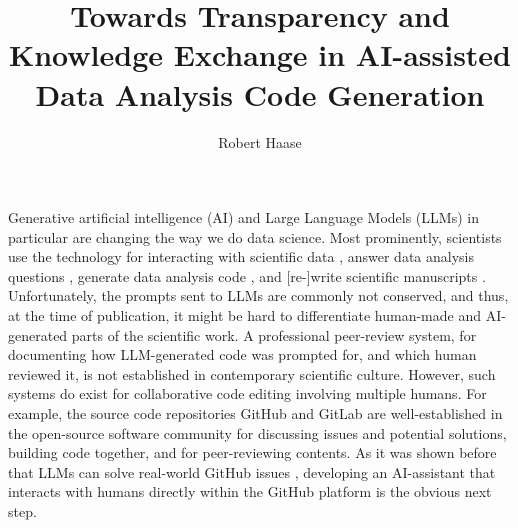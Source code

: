 \documentclass[sn-mathphys-num]{sn-jnl}%
\theoremstyle{thmstyleone}%
\theoremstyle{thmstyletwo}%
\theoremstyle{thmstylethree}%
\begin{document}
\title[Towards Transparency and Knowledge Exchange in AI-assisted Data Analysis Code Generation]{Towards Transparency and Knowledge Exchange in AI-assisted Data Analysis Code Generation}


\author[1,2]{Robert Haase}



\maketitle

Generative artificial intelligence (AI) and Large Language Models (LLMs) in particular are changing the way we do data science. Most prominently, scientists use the technology for interacting with scientific data \cite{Royer2023}, answer data analysis questions \cite{Lai2022DS1000, lei2024bioimage}, generate data analysis code \cite{Royer2024, benchmark_llm_bia, chen2021evaluating}, and [re-]write scientific manuscripts \cite{lu2024aiscientist}. Unfortunately, the prompts sent to LLMs are commonly not conserved, and thus, at the time of publication, it might be hard to differentiate human-made and AI-generated parts of the scientific work. A professional peer-review system, for documenting how LLM-generated code was prompted for, and which human reviewed it, is not established in contemporary scientific culture. However, such systems do exist for collaborative code editing involving multiple humans. For example, the source code repositories GitHub and GitLab are well-established in the open-source software community for discussing issues and potential solutions, building code together, and for peer-reviewing contents. As it was shown before that LLMs can solve real-world GitHub issues \cite{jimenez2024swebenchlanguagemodelsresolve}, developing an AI-assistant that interacts with humans directly within the GitHub platform is the obvious next step. 
\end{document}
